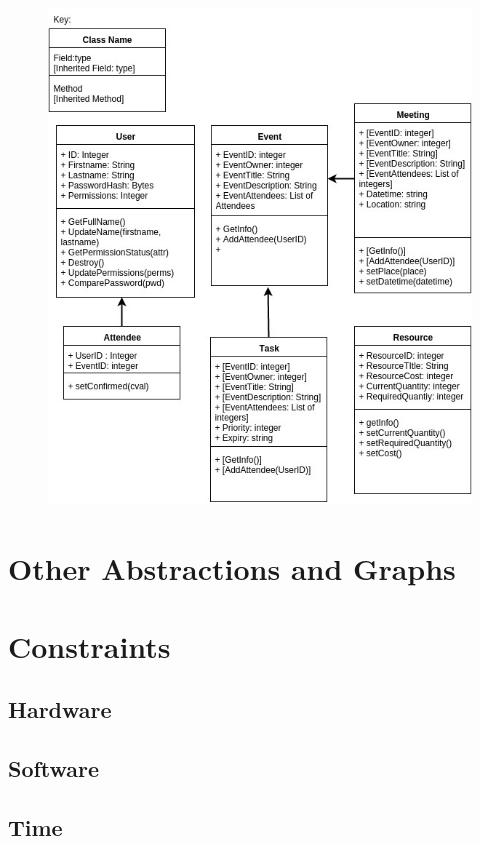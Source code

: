 \begin{figure}[H]
	\includegraphics[width=\textwidth]{./Analysis/diagrams/ods.jpg}
\end{figure}

\section{Other Abstractions and Graphs}

\section{Constraints}

\subsection{Hardware}

\subsection{Software}

\subsection{Time}

